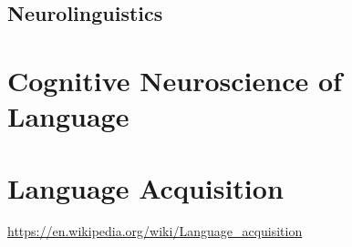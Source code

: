 \documentclass[a4paper]{article}
\begin{document}
        \subsection{Neurolinguistics}
    
    
    \section{Cognitive Neuroscience of Language}
    
    
    \section{Language Acquisition}
        \url{https://en.wikipedia.org/wiki/Language_acquisition}
        
        
\end{document}
